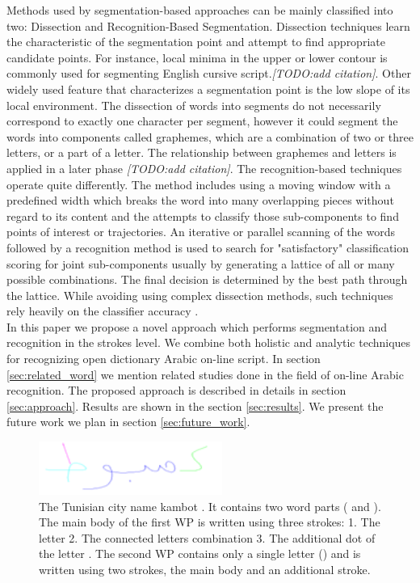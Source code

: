 \documentclass[journal,compsoc]{IEEEtran}
\begin{document}
Methods used by segmentation-based approaches can be mainly classified into two: Dissection and Recognition-Based Segmentation. Dissection techniques learn the characteristic of the segmentation point and attempt to find appropriate candidate points. For instance, local minima in the upper or lower contour is commonly used for segmenting English cursive script.\emph{[TODO:add citation]}. Other widely used feature that characterizes a segmentation point is the low slope of its local environment. The dissection of words into segments do not necessarily correspond to exactly one character per segment, however it could segment the words into components called graphemes, which are a combination of two or three letters, or a part of a letter. The relationship between graphemes and letters is applied in a later phase \emph{[TODO:add citation]}. The recognition-based techniques operate quite differently. The method includes using a moving window with a predefined width which breaks the word into many overlapping pieces without regard to its content and the attempts to classify those sub-components to find points of interest or trajectories. An iterative or parallel scanning of the words followed by a recognition method is used to search for "satisfactory" classification scoring for joint sub-components usually by generating a lattice of all or many possible combinations. The final decision is determined by the best path through the lattice. While avoiding using complex dissection methods, such techniques rely heavily on the classifier accuracy \cite{casey1996survey}. \\

In this paper we propose a novel approach which performs segmentation and recognition in the strokes level. We combine both holistic and analytic techniques for recognizing open dictionary Arabic on-line script. In section \ref{sec:related_word} we mention related studies done in the field of on-line Arabic recognition. The proposed approach is described in details in section \ref{sec:approach}. Results are shown in the section \ref{sec:results}. We present the future work we plan in section \ref{sec:future_work}.

\begin{figure}
\centering
\includegraphics[width=6cm]{./figures/kmbot_color}       
\caption{The Tunisian city name kambot . It contains two word parts ( and ). The main body of the first WP is written using three strokes: 1. The letter  2. The connected letters combination  3. The additional dot of the letter . The second WP contains only a single letter () and is written using two strokes, the main body and an additional stroke.}
\label{fig:kmbot}
\end{figure}
\end{document}
